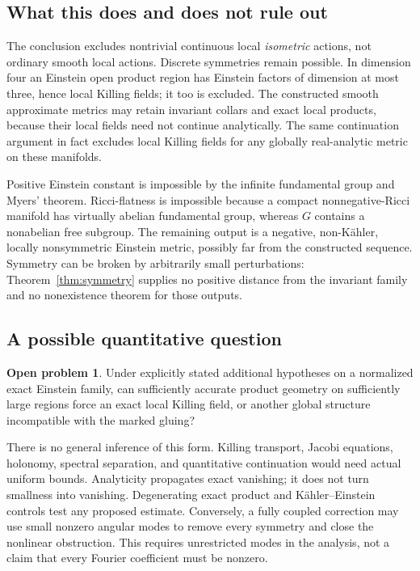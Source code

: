 \documentclass[11pt]{article}
\theoremstyle{definition}\newtheorem{problem}[theorem]{Open problem}
\theoremstyle{remark}\newtheorem{remark}[theorem]{Scope}
\numberwithin{equation}{section}
\begin{document}
\subsection{What this does and does not rule out}\label{sec:symmetry-scope}
The conclusion excludes nontrivial continuous local \emph{isometric} actions, not ordinary smooth local actions. Discrete symmetries remain possible. In dimension four an Einstein open product region has Einstein factors of dimension at most three, hence local Killing fields; it too is excluded. The constructed smooth approximate metrics may retain invariant collars and exact local products, because their local fields need not continue analytically. The same continuation argument in fact excludes local Killing fields for any globally real-analytic metric on these manifolds.

Positive Einstein constant is impossible by the infinite fundamental group and Myers' theorem. Ricci-flatness is impossible because a compact nonnegative-Ricci manifold has virtually abelian fundamental group, whereas $G$ contains a nonabelian free subgroup. The remaining output is a negative, non-K\"ahler, locally nonsymmetric Einstein metric, possibly far from the constructed sequence. Symmetry can be broken by arbitrarily small perturbations: Theorem~\ref{thm:symmetry} supplies no positive distance from the invariant family and no nonexistence theorem for those outputs.

\subsection{A possible quantitative question}\label{sec:quantitative-symmetry}
\begin{problem}
Under explicitly stated additional hypotheses on a normalized exact Einstein family, can sufficiently accurate product geometry on sufficiently large regions force an exact local Killing field, or another global structure incompatible with the marked gluing?
\end{problem}
There is no general inference of this form. Killing transport, Jacobi equations, holonomy, spectral separation, and quantitative continuation would need actual uniform bounds. Analyticity propagates exact vanishing; it does not turn smallness into vanishing. Degenerating exact product and K\"ahler--Einstein controls test any proposed estimate. Conversely, a fully coupled correction may use small nonzero angular modes to remove every symmetry and close the nonlinear obstruction. This requires unrestricted modes in the analysis, not a claim that every Fourier coefficient must be nonzero.
\end{document}

